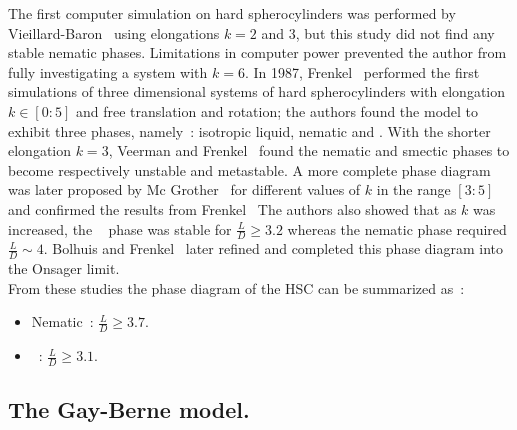 The first computer simulation on hard spherocylinders was performed by 
Vieillard-Baron~\cite{VieillardBaron74} using elongations $k=2$ and $3$, but this study did not find
any stable nematic phases. Limitations in computer power prevented the author from fully
investigating a system with $k=6$. In 1987, Frenkel~\cite{Frenkel87,Frenkel87a} performed the
first simulations of three dimensional systems of hard spherocylinders with
elongation $k \in [0:5]$ and free translation and rotation; the authors found the model to 
exhibit three phases, namely~: isotropic liquid, nematic and
\smA. With the shorter elongation $k=3$, Veerman and Frenkel~\cite{VeermanFrenkel96} 
found the nematic and smectic phases to become respectively unstable and metastable. A more
complete phase diagram was later proposed by Mc Grother~\etal\cite{McGrotherWilliamson96} for
different values of $k$ in the range $[3:5]$ and confirmed the results from Frenkel~\etal 
The authors also showed that as $k$ was increased, the \smA~ phase was stable for
$\frac{L}{D}\geq 3.2$ whereas the nematic phase required $\frac{L}{D}\sim 4$. 
Bolhuis and Frenkel~\cite{BolhuisFrenkel97}
later refined and completed this phase diagram into the Onsager limit.\\
From these studies the phase diagram of the HSC can be summarized as~:
\begin{itemize}
	\item Nematic~: $\frac{L}{D} \geq 3.7$.
	\item \SmA~: $\frac{L}{D} \geq 3.1$.
\end{itemize}


\subsection{The Gay-Berne model.}
\label{ss:GB}



